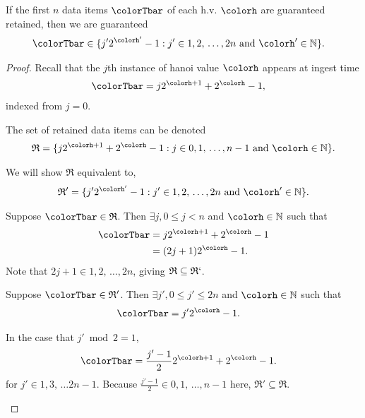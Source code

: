 \begin{lemma}
\label{thm:retained-equivalence-stretched}
If the first $n$ data items $\colorTbar$ of each h.v. $\colorh$ are guaranteed retained, then we are guaranteed
\begin{align*}
\colorTbar
&\in
\{
  j'2^{\colorh'} - 1
  :
  j' \in 1,2,\,\ldots,2n
  \text{ and }
  \colorh' \in \mathbb{N}
\}.
\end{align*}
\end{lemma}
\begin{proof}

Recall that the $j$th instance of hanoi value $\colorh$ appears at ingest time
\begin{align*}
\colorTbar
&= j2^{\colorh + 1} + 2^{\colorh} - 1,
\end{align*}
indexed from $j=0$.

The set of retained data items can be denoted
\begin{align*}
\mathfrak{R} =
\{
  j2^{\colorh + 1} + 2^{\colorh} - 1
  :
  j \in 0,1,\,\ldots,n-1
  \text{ and }
  \colorh \in \mathbb{N}
\}.
\end{align*}

We will show $\mathfrak{R}$ equivalent to,
\begin{align*}
\mathfrak{R}' =
\{
  j'2^{\colorh'} - 1
  :
  j' \in 1,2,\,\ldots,2n
  \text{ and }
  \colorh' \in \mathbb{N}
\}.
\end{align*}

\begin{proofpart}
Suppose $\colorTbar \in \mathfrak{R}$.
Then $\exists j,  0 \leq j < n$ and $\colorh \in \mathbb{N}$ such that
\begin{align*}
\colorTbar
&= j2^{\colorh + 1} + 2^{\colorh} - 1\\
&= (2j + 1)2^{\colorh} - 1.
\end{align*}
Note that $2j + 1 \in 1,2,\,\ldots,2n$, giving $\mathfrak{R} \subseteq \mathfrak{R}`$.
\end{proofpart}

\begin{proofpart}
Suppose $\colorTbar \in \mathfrak{R}'$.
Then $\exists j',  0 \leq j' \leq 2n$ and $\colorh \in \mathbb{N}$ such that
\begin{align*}
\colorTbar
&= j'2^{\colorh} - 1.
\end{align*}

In the case that $j' \bmod 2 = 1$,
\begin{align*}
\colorTbar
&= \frac{j'-1}{2} 2^{\colorh + 1} + 2^{\colorh} - 1.
\end{align*}
for $j' \in 1, 3, \,\ldots 2n-1$.
Because $\frac{j'-1}{2} \in 0, 1, \, \ldots, n - 1$ here, $\mathfrak{R}' \subseteq \mathfrak{R}$.


\end{proofpart}
\end{proof}
